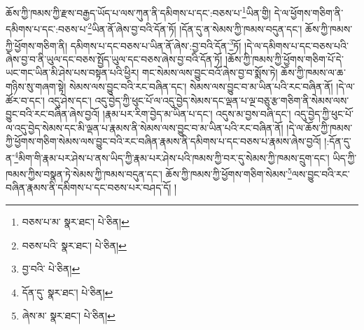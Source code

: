 ཆོས་ཀྱི་ཁམས་ཀྱི་རྫས་བརྒྱད་ཡོད་པ་ལས་ཀུན་ནི་དམིགས་པ་དང་:བཅས་པ་\footnote{བཅས་པ་མ་  སྣར་ཐང་།  པེ་ཅིན། }ཡིན་གྱི། དེ་ལ་ཕྱོགས་གཅིག་ནི་དམིགས་པ་དང་:བཅས་པ་\footnote{བཅས་པའི་  སྣར་ཐང་།  པེ་ཅིན། }ཡིན་ནོ་ཞེས་བྱ་བའི་དོན་ཏོ། །དོན་དུ་ན་སེམས་ཀྱི་ཁམས་བདུན་དང་། ཆོས་ཀྱི་ཁམས་ཀྱི་ཕྱོགས་གཅིག་ནི། དམིགས་པ་དང་བཅས་པ་ཡིན་ནོ་ཞེས་:བྱ་བའི་དོན་\footnote{བྱ་བའི་  པེ་ཅིན། }ཏོ། །དེ་ལ་དམིགས་པ་དང་བཅས་པའི་ཞེས་བྱ་བ་ནི་ཡུལ་དང་བཅས་སྤྱོད་ཡུལ་དང་བཅས་ཞེས་བྱ་བའི་དོན་ཏོ། །ཆོས་ཀྱི་ཁམས་ཀྱི་ཕྱོགས་གཅིག་པོ་དེ་ཡང་གང་ཡིན་མི་ཤེས་པས་བསྟན་པའི་ཕྱིར། གང་སེམས་ལས་བྱུང་བའོ་ཞེས་བྱ་བ་སྨོས་ཏེ། ཆོས་ཀྱི་ཁམས་ལ་ཆ་གཉིས་སུ་གཞག་སྟེ། སེམས་ལས་བྱུང་བའི་རང་བཞིན་དང་། སེམས་ལས་བྱུང་བ་མ་ཡིན་པའི་རང་བཞིན་ནོ། །དེ་ལ་ཚོར་བ་དང་། འདུ་ཤེས་དང་། འདུ་བྱེད་ཀྱི་ཕུང་པོ་ལ་འདུ་བྱེད་སེམས་དང་ལྡན་པ་ལྔ་བཅུ་རྩ་གཅིག་ནི་སེམས་ལས་བྱུང་བའི་རང་བཞིན་ཞེས་བྱའོ། །རྣམ་པར་རིག་བྱེད་མ་ཡིན་པ་དང་། འདུས་མ་བྱས་བཞི་དང་། འདུ་བྱེད་ཀྱི་ཕུང་པོ་ལ་འདུ་བྱེད་སེམས་དང་མི་ལྡན་པ་རྣམས་ནི་སེམས་ལས་བྱུང་བ་མ་ཡིན་པའི་རང་བཞིན་ནོ། །དེ་ལ་ཆོས་ཀྱི་ཁམས་ཀྱི་ཕྱོགས་གཅིག་སེམས་ལས་བྱུང་བའི་རང་བཞིན་རྣམས་ནི་དམིགས་པ་དང་བཅས་པ་རྣམས་ཞེས་བྱའོ། །:དོན་དུ་ན་\footnote{དོན་དུ་  སྣར་ཐང་།  པེ་ཅིན། }མིག་གི་རྣམ་པར་ཤེས་པ་ནས་ཡིད་ཀྱི་རྣམ་པར་ཤེས་པའི་ཁམས་ཀྱི་བར་དུ་སེམས་ཀྱི་ཁམས་དྲུག་དང་། ཡིད་ཀྱི་ཁམས་ཀྱིས་བསྣན་ཏེ་སེམས་ཀྱི་ཁམས་བདུན་དང་། ཆོས་ཀྱི་ཁམས་ཀྱི་ཕྱོགས་གཅིག་སེམས་\footnote{ཞེས་མ་  སྣར་ཐང་།  པེ་ཅིན། }ལས་བྱུང་བའི་རང་བཞིན་རྣམས་ནི་དམིགས་པ་དང་བཅས་པར་བཤད་དོ། །
